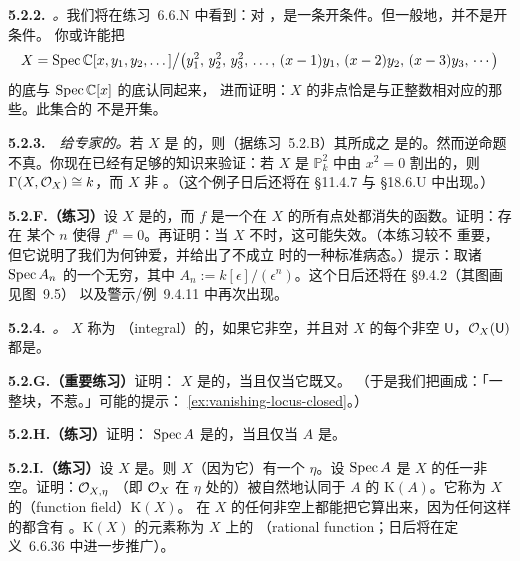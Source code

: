 \textbf{5.2.2.}\ \emph{\trhRemark{}。}\quad 我们将在练习~6.6.N 中看到：对%
\trLocally\trNoetherian{}\trScheme，\trReducedness{}是一条开条件。但一般地，\trReducedness{}并不是开条件。
你或许能把
\[
X=\operatorname{Spec}\mathbb{C}[x,y_1,y_2,\dots]\big/\bigl(y_1^2,\,y_2^2,\,y_3^2,\,\dots,\,(x-1)y_1,\,(x-2)y_2,\,(x-3)y_3,\,\cdots\bigr)
\]
的底\trTopologicalSpace{}与 $\operatorname{Spec}\mathbb{C}[x]$ 的底\trTopologicalSpace{}认同起来，
进而证明：$X$ 的非\trReduced{}点恰是与正整数相对应的那些\trClosedPoint。此集合的%
\trComplement{}不是\trZariski{}开集。

\textbf{5.2.3.}\ \hard\ \emph{给专家的\trhWarning{}。}\quad 若\trScheme{} $X$ 是%
\trReduced{}的，则（据练习~5.2.B）其\trGlobalSections{}所成之%
\trRing{}是\trReduced{}的。然而逆命题不真。你现在已经有足够的知识来验证：若 $X$ 是
$\mathbb{P}^2_k$ 中由 $x^2=0$ 割出的\trScheme，则 $\Gamma(X,\mathcal{O}_X)\cong k$，而 $X$ 非%
\trReduced{}。（这个例子日后还将在 \S11.4.7 与 \S18.6.U 中出现。）

\textbf{5.2.F.（练习）}\quad 设 $X$ 是\trQuasicompact{}的，而 $f$ 是一个在 $X$ 的所有点处都消失的函数。证明：存在
某个 $n$ 使得 $f^n=0$。再证明：当 $X$ 不\trQuasicompact{}时，这可能失效。（本练习较不
重要，但它说明了我们为何钟爱\trQuasicompactness，并给出了\trQuasicompactness{}不成立
时的一种标准病态。）提示：取诸 $\operatorname{Spec} A_n$ 的一个无穷\trDisjointUnion，其中%
$A_n:=k[\epsilon]/(\epsilon^n)$。这个\trScheme{}日后还将在 \S9.4.2（其图画见图~9.5）
以及警示/例~9.4.11 中再次出现。

\textbf{5.2.4.}\ \emph{\trhDefinition{}。}\quad \trScheme{} $X$ 称为%
\textbf{\trIntegral}（integral）的，如果它非空，并且对 $X$ 的每个非空\trOpenSubset{}%
$\mathsf{U}$，$\mathcal{O}_X(\mathsf{U})$ 都是\trIntegralDomain。

\textbf{5.2.G.（重要练习）}\quad 证明：\trScheme{} $X$ 是\trIntegral{}的，当且仅当它既\trIrreducible{}又\trReduced{}。
（于是我们把\trIntegral{}\trScheme{}画成：「一整块，不惹\trFuzz{}。」可能的提示：%
\cref{ex:vanishing-locus-closed}。）

\textbf{5.2.H.（练习）}\quad 证明：\trAffineScheme{} $\operatorname{Spec} A$ 是\trIntegral{}的，当且仅当 $A$ 是\trIntegralDomain。

\textbf{5.2.I.（练习）}\quad 设 $X$ 是\trIntegral{}\trScheme。则 $X$（因为它\trIrreducible）有一个\trGenericPoint{}%
$\eta$。设 $\operatorname{Spec} A$ 是 $X$ 的任一非空\trAffine\trOpenSubset。证明：$\mathcal{O}_{X,\eta}$%
（即 $\mathcal{O}_X$ 在 $\eta$ 处的\trStalk）被自然地认同于 $A$ 的\trFractionField{}%
$\mathrm{K}(A)$。它称为 $X$ 的\textbf{\trFunctionField}（function field）$\mathrm{K}(X)$。
在 $X$ 的任何非空\trOpenSet{}上都能把它算出来，因为任何这样的\trOpenSet{}都含有%
\trGenericPoint。$\mathrm{K}(X)$ 的元素称为 $X$ 上的\textbf{\trRationalFunction}
（rational function；日后将在定义~6.6.36 中进一步推广）。


